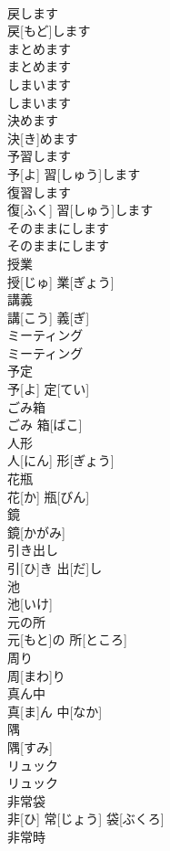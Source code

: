 \documentclass[8pt]{extreport}
\begin{document}
\begin{CJK}{UTF8}{min}
\\	戻します	
\\	戻[もど]します		
\\	まとめます	
\\	まとめます		
\\	しまいます	
\\	しまいます		
\\	決めます	
\\	決[き]めます		
\\	予習します	
\\	予[よ] 習[しゅう]します		
\\	復習します	
\\	復[ふく] 習[しゅう]します		
\\	そのままにします	
\\	そのままにします		
\\	授業	
\\	授[じゅ] 業[ぎょう]		
\\	講義	
\\	講[こう] 義[ぎ]		
\\	ミーティング	
\\	ミーティング		
\\	予定	
\\	予[よ] 定[てい]		
\\	ごみ箱	
\\	ごみ 箱[ばこ]		
\\	人形	
\\	人[にん] 形[ぎょう]		
\\	花瓶	
\\	花[か] 瓶[びん]		
\\	鏡	
\\	鏡[かがみ]		
\\	引き出し	
\\	引[ひ]き 出[だ]し		
\\	池	
\\	池[いけ]		
\\	元の所	
\\	元[もと]の 所[ところ]		
\\	周り	
\\	周[まわ]り		
\\	真ん中	
\\	真[ま]ん 中[なか]		
\\	隅	
\\	隅[すみ]		
\\	リュック	
\\	リュック		
\\	非常袋	
\\	非[ひ] 常[じょう] 袋[ぶくろ]		
\\	非常時	

\end{CJK}
\end{document}
